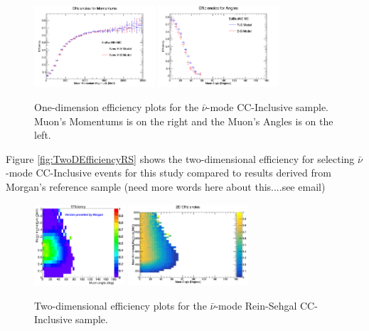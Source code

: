 \documentclass[11pt]{article}
\begin{document}
\begin{figure}[H]
\centering
\includegraphics[width=0.4\textwidth]{CCInclusivePlots/OneDAntiNuEffMomentum.png}
\includegraphics[width=0.4\textwidth]{CCInclusivePlots/OneDAntiNuEffAngle.png}
\caption{One-dimension efficiency plots for the $\bar{\nu}$-mode CC-Inclusive sample. Muon's Momentums is on the right and the Muon's Angles is on the left.}
\end{figure}\label{fig:OneDEfficiencyAntiNu}

Figure \ref{fig:TwoDEfficiencyRS} shows the two-dimensional efficiency for selecting $\bar{\nu}$-mode CC-Inclusive events for this study compared to results derived from Morgan's reference sample (need more words here about this....see email)

\begin{figure}[H]
\centering
\includegraphics[width=0.3\textwidth]{CCInclusivePlots/MorgansCCInclusiveSample.png}
\includegraphics[width=0.4\textwidth]{CCInclusivePlots/2DEffCompareANMRS.png}
\caption{Two-dimensional efficiency plots for the $\bar{\nu}$-mode Rein-Sehgal CC-Inclusive sample.}
\end{figure}\label{fig:TwoDEfficiencyRS}
\end{document}
